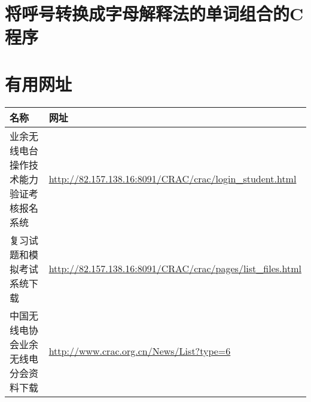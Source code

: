 \newpage


\section{将呼号转换成字母解释法的单词组合的C程序}



\newpage

\section{有用网址}

\begin{longtable}{|p{8cm}|p{8cm}|}
  \hline
  \textbf{名称}          & \textbf{网址}                                                     \\
  \hline
  业余无线电台操作技术能力验证考核报名系统 & \url{http://82.157.138.16:8091/CRAC/crac/login_student.html}    \\
  \hline
  复习试题和模拟考试系统下载        & \url{http://82.157.138.16:8091/CRAC/crac/pages/list_files.html} \\
  \hline
  中国无线电协会业余无线电分会资料下载   & \url{http://www.crac.org.cn/News/List?type=6}                   \\
  \hline
\end{longtable}
